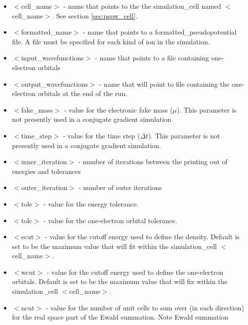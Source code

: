 \begin{itemize}
        \item $<$cell\_name$>$ - name that points to the
              the simulation\_cell named $<$cell\_name$>$.  See section \ref{sec:pspw_cell}.
        \item $<$formatted\_name$>$ - name that points
              to a formatted\_pseudopotential file.  A file must
              be specified for each kind of ion in the simulation.
        \item $<$input\_wavefunctions$>$ - name that points
              to a file containing one-electron orbitals
        \item $<$output\_wavefunctions$>$ - name that will
              point to file containing the one-electron orbitals at the
              end of the run. 
        \item $<$fake\_mass$>$ - value for the electronic
              fake mass ($\mu$). This parameter is not presently used in a 
              conjugate gradient simulation
        \item $<$time\_step$>$ - value for the time step ($\Delta t$).  This
              parameter is not presently used in a conjugate gradient simulation.
        \item $<$inner\_iteration$>$ - number of iterations between the 
              printing out of energies and tolerances
        \item $<$outer\_iteration$>$ - number of outer iterations
        \item $<$tole$>$ - value for the energy tolerance.
        \item $<$tolc$>$ - value for the one-electron orbital tolerance.
        \item $<$ecut$>$ - value for the cutoff energy used
                           to define the density. Default is set
                           to be the maximum value that will fit
                            within the simulation\_cell $<$cell\_name$>$.
        \item $<$wcut$>$ - value for the cutoff energy used
                           to define the one-electron orbitals.
                           Default is set to be the maximum value that 
                           will fix within the simulation\_cell $<$cell\_name$>$.
        \item $<$ncut$>$ - value for the number of unit cells
                          to sum over (in each direction) for the real space
                          part of the Ewald summation. Note Ewald summation

\end{itemize}
